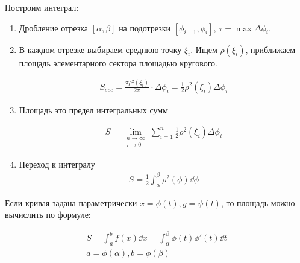 
\begin{minipage}{\linewidth}
  \begin{multicols*}{2}
  \columnbreak

  Построим интеграл:
  \begin{enumerate}
    \item Дробление отрезка \([\alpha, \beta]\) на подотрезки
      \([\phi_{i - 1}, \phi_{i}]\), \(\tau = \max \Delta \phi_{i}\).

    \item В каждом отрезке выбираем среднюю точку \(\xi_{i}\). Ищем
      \(\rho(\xi_{i})\), приближаем площадь элементарного сектора площадью
      кругового.
    
      \begin{align*}
        S_{sec}
        = \frac{\pi \rho^2(\xi_{i})}{2 \pi} \cdot \Delta \phi_{i}
        = \frac{1}{2} \rho^2(\xi_{i}) \Delta \phi_{i}
      \end{align*}

    \item Площадь это предел интегральных сумм
    
    \begin{align*}
      S = \lim_{\substack{n \to \infty \\ \tau \to 0}}
        \sum_{i = 1}^{n} \frac{1}{2} \rho^2(\xi_{i}) \Delta \phi_{i}
    \end{align*}
    
    \item Переход к интегралу
    \begin{align*}
      S = \frac{1}{2} \int_{\alpha}^{\beta} \rho^2(\phi) \dd \phi
    \end{align*}
  \end{enumerate}

  \end{multicols*}
\end{minipage}

\begin{remark}
  Если кривая задана параметрически \(x = \phi(t), y = \psi(t)\), то площадь
  можно вычислить по формуле:

  \begin{align*}
    S
    = \int_{a}^{b} f(x) \dd x
    = \int_{\alpha}^{\beta} \phi(t) \phi'(t) \dd t \\
    a = \phi(\alpha), b = \phi(\beta)
  \end{align*}
\end{remark}